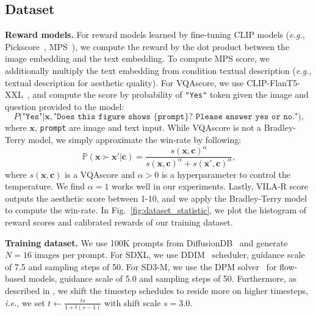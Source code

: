 \subsection{Dataset}\label{appendix:dataset}
\vspace{0.05in}
\noindent
{\bf Reward models.}
For reward models learned by fine-tuning CLIP models (\emph{e.g.}, Pickscore~\citep{kirstain2023pick}, MPS~\citep{zhang2024learning}), we compute the reward by the dot product between the image embedding and the text embedding. To compute MPS score, we additionally multiply the text embedding from condition textual description (\emph{e.g.}, textual description for aesthetic quality).
For VQAscore, we use CLIP-FlanT5-XXL~\citep{lin2025evaluating}, and compute the score by probability of {\tt{"Yes"}} token given the image and question provided to the model: 
\begin{equation}
    P\big({\texttt{"Yes"}} |\mathbf{x}, {\texttt{"Does this figure shows \{prompt\}? Please answer yes or no."}}\big)\text{,}
\end{equation}
where $\mathbf{x}$, {\tt{prompt}} are image and text input.
While VQAscore is not a Bradley-Terry model, we simply approximate the win-rate by following:
\begin{equation}
    \mathbb{P}(\mathbf{x} \succ \mathbf{x}' | \mathbf{c}) =\frac{ s(\mathbf{x}, \mathbf{c})^\alpha}{ s(\mathbf{x}, \mathbf{c})^\alpha + s(\mathbf{x}', \mathbf{c})^\alpha}\text{,}
\end{equation}
where $s(\mathbf{x}, \mathbf{c})$ is a VQAscore and $\alpha > 0$ is a hyperparameter to control the temperature. We find $\alpha=1$ works well in our experiments.
Lastly, VILA-R score~\citep{ke2023vila} outputs the aesthetic score between 1-10, and we apply the Bradley-Terry model to compute the win-rate.
In Fig.~\ref{fig:dataset_statistic}, we plot the histogram of reward scores and calibrated rewards of our training dataset.

\vspace{0.05in}
\noindent
{\bf Training dataset.}
We use 100K prompts from DiffusionDB~\citep{wang2022diffusiondb} and generate $N=16$ images per prompt.
For SDXL, we use DDIM~\citep{song2020denoising} scheduler, guidance scale of 7.5 and sampling steps of 50. 
For SD3-M, we use the DPM solver~\citep{lu2022dpm} for flow-based models, guidance scale of 5.0 and sampling steps of 50. 
Furthermore, as described in \citep{esser2024scaling}, we shift the timestep schedules to reside more on higher timesteps, \emph{i.e.}, we set $t \leftarrow \frac{ts}{1+ t(s-1)}$ with shift scale $s=3.0$.
 
